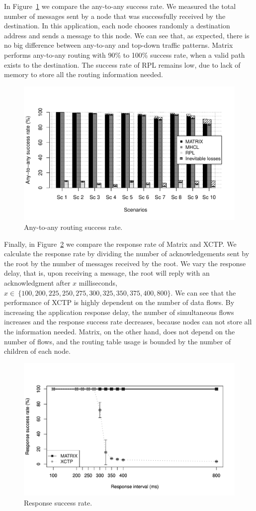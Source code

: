 In Figure~\ref{fig:txany} we compare the any-to-any success rate. We measured the total number of messages sent by a node that was successfully received by the destination. In this application, each node chooses randomly a destination address and sends a message to this node. We can see that, as expected, there is no big difference between any-to-any and top-down traffic patterns. Matrix performs any-to-any routing with 90\% to 100\% success rate, when a valid path exists to the destination. The success rate of RPL remains low, due to lack of memory to store all the routing information needed. 

\begin{figure}[h]
    \centering
    \includegraphics[width=1\linewidth]{Images/anytoany.pdf}
    \caption{Any-to-any routing success rate.}
    \label{fig:txany}
\end{figure}


Finally, in Figure~\ref{fig:txrsp} we compare the response rate of Matrix and XCTP. We calculate the response rate by dividing the number of acknowledgements sent by the root by the number of messages received by the root. We vary the response delay, that is, upon receiving a message, the root will reply with an acknowledgment after $x$ milliseconds, $x \in\ \{100,200,225,250,275,300,325,350,375,400,800\}$. We can see that the performance of XCTP is highly dependent on the number of data flows. By increasing the application response delay, the number of simultaneous flows increases and the response success rate decreases, because nodes can not store all the information needed. Matrix, on the other hand, does not depend on the number of flows, and the routing table usage is bounded by the number of children of each node.

\begin{figure}[h]
    \centering
    \includegraphics[width=1\linewidth]{Images/rsprate.pdf}
    \caption{Response success rate.}
    \label{fig:txrsp}
\end{figure}